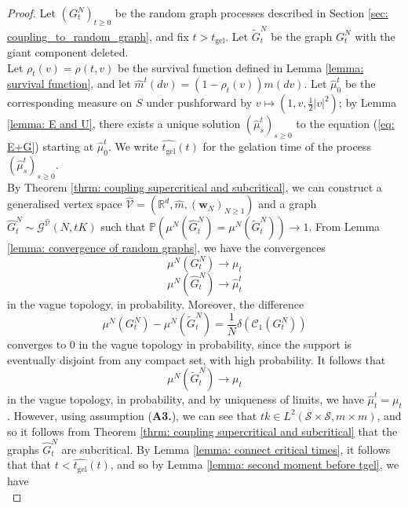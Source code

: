 \begin{proof} Let $(G^N_t)_{t\geq 0}$ be the random graph processes described in Section  \ref{sec: coupling_to_random_graph}, and fix $t>t_\mathrm{gel}$. Let $\widetilde{G}^N_{t}$ be the graph $G^N_{t}$ with the giant component deleted. \medskip \\ Let $\rho_{t}(v)=\rho(t, v)$ be the survival function defined in Lemma \ref{lemma: survival function}, and let $\widehat{m}^t(dv)=(1-\rho_{t}(v))m(dv)$. Let $\widehat{\mu}^t_0$ be the corresponding measure on $S$ under pushforward by $v\mapsto (1, v, \frac{1}{2}|v|^2)$; by Lemma \ref{lemma: E and U}, there exists a unique solution $(\widehat{\mu}^t_s)_{s\geq 0}$ to the equation (\ref{eq: E+G}) starting at $\widehat{\mu}^t_0$. We write $\widehat{t_\mathrm{gel}}(t)$ for the gelation time of the process $(\widehat{\mu}^t_s)_{s\geq 0}$. \medskip \\ By Theorem \ref{thrm: coupling supercritical and subcritical}, we can construct a generalised vertex space $\widehat{\mathcal{V}}=(\mathbb{R}^d, \widehat{m}, (\mathbf{w}_N)_{N\ge 1})$ and a graph $\widehat{G}^N_{t}\sim \mathcal{G}^{\widehat{\mathcal{V}}}(N,tK)$ such that $
    \mathbb{P}(\mu^N(\widehat{G}^N_{t})=\mu^N(\widetilde{G}^N_{t}))\rightarrow 1.
$ From Lemma \ref{lemma: convergence of random graphs}, we have the convergences 
\begin{equation}
    \mu^N(G^N_{t})\rightarrow {\mu}_{t}
\end{equation}
\begin{equation}
    \mu^N(\widehat{G}^N_{t})\rightarrow \widehat{\mu}^t_{t}
\end{equation} in the vague topology, in probability.  Moreover, the difference \begin{equation}
    \mu^N(G^N_{t})-\mu^N(\widetilde{G}^N_{t})=\frac{1}{N}\delta(\mathcal{C}_1(G^N_{t}))
\end{equation} converges to $0$ in the vague topology in probability, since the support is eventually disjoint from any compact set, with high probability. It follows that \begin{equation}
    \mu^N(\widetilde{G}^N_{t})\rightarrow \mu_{t}
\end{equation} in the vague topology, in probability, and by uniqueness of limits, we have $\widehat{\mu}^t_{t}=\mu_{t}$. However, using assumption (\textbf{A3.}), we can see that $t k\in L^2(\mathcal{S}\times\mathcal{S}, m\times m)$, and so it follows from Theorem \ref{thrm: coupling supercritical and subcritical} that the graphs $\widehat{G}^N_{t}$ are subcritical. By Lemma \ref{lemma: connect critical times}, it follows that that  $t<\widehat{t_\mathrm{gel}}(t)$, and so by Lemma \ref{lemma: second moment before tgel}, we have \begin{equation}

\end{equation}
\end{proof}
